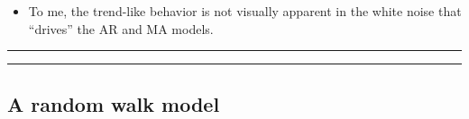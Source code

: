 \documentclass[]{article}
\providecommand{\tightlist}{%
  \setlength{\itemsep}{0pt}\setlength{\parskip}{0pt}}
\begin{document}
\begin{itemize}
\tightlist
\item
  To me, the trend-like behavior is not visually apparent in the white
  noise that ``drives'' the AR and MA models.
\end{itemize}

\begin{center}\rule{0.5\linewidth}{\linethickness}\end{center}

\begin{center}\rule{0.5\linewidth}{\linethickness}\end{center}

\subsection{A random walk model}\label{a-random-walk-model}
\end{document}
